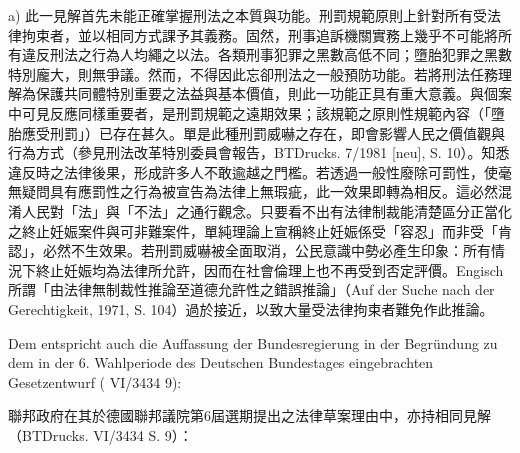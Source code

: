 \documentclass[12pt]{article}
\begin{document}
\begin{transpara}
a) 此一見解首先未能正確掌握刑法之本質與功能。刑罰規範原則上針對所有受法律拘束者，並以相同方式課予其義務。固然，刑事追訴機關實務上幾乎不可能將所有違反刑法之行為人均繩之以法。各類刑事犯罪之黑數高低不同；墮胎犯罪之黑數特別龐大，則無爭議。然而，不得因此忘卻刑法之一般預防功能。若將刑法任務理解為保護共同體特別重要之法益與基本價值，則此一功能正具有重大意義。與個案中可見反應同樣重要者，是刑罰規範之遠期效果；該規範之原則性規範內容（「墮胎應受刑罰」）已存在甚久。單是此種刑罰威嚇之存在，即會影響人民之價值觀與行為方式（參見刑法改革特別委員會報告，BTDrucks. 7/1981 [neu], S. 10）。知悉違反時之法律後果，形成許多人不敢逾越之門檻。若透過一般性廢除可罰性，使毫無疑問具有應罰性之行為被宣告為法律上無瑕疵，此一效果即轉為相反。這必然混淆人民對「法」與「不法」之通行觀念。只要看不出有法律制裁能清楚區分正當化之終止妊娠案件與可非難案件，單純理論上宣稱終止妊娠係受「容忍」而非受「肯認」，必然不生效果。若刑罰威嚇被全面取消，公民意識中勢必產生印象：所有情況下終止妊娠均為法律所允許，因而在社會倫理上也不再受到否定評價。Engisch 所謂「由法律無制裁性推論至道德允許性之錯誤推論」（Auf der Suche nach der Gerechtigkeit, 1971, S. 104）過於接近，以致大量受法律拘束者難免作此推論。
\end{transpara}

\syncleft
\begin{sourcepara}
Dem entspricht auch die Auffassung der Bundesregierung in der Begründung zu dem in der 6. Wahlperiode des Deutschen Bundestages eingebrachten Gesetzentwurf (\abbrBTDrucks{} VI/3434 \abbrS{} 9):
\end{sourcepara}
\begin{transpara}
聯邦政府在其於德國聯邦議院第6屆選期提出之法律草案理由中，亦持相同見解（BTDrucks. VI/3434 S. 9）：
\end{transpara}

\syncleft
\begin{sourcepara}
\end{sourcepara}
\begin{transpara}
\end{transpara}
\end{document}

